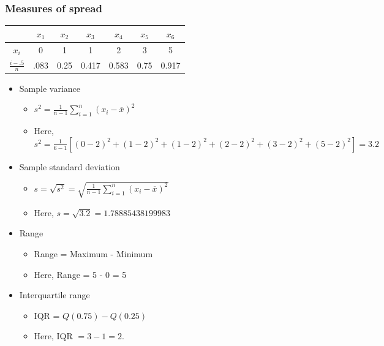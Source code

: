 \documentclass{beamer}
\providecommand{\ov}[1]{\overline{#1}}
\numberwithin{equation}{section}
\begin{document}
\begin{frame}
\frametitle{Measures of spread}\scriptsize

\begin{center}
\begin{tabular}{c|cccccc}
& $x_1$ & $x_2$ & $x_3$& $x_4$ & $x_5$ & $x_6$  \\ \hline
$x_i$ & 0 & 1 & 1 & 2 & 3 & 5 \\
$\frac{i - .5}{n}$ & .083 & 0.25 & 0.417 & 0.583 & 0.75 & 0.917
\end{tabular}
\end{center} 

\begin{itemize}
\item Sample variance
\begin{itemize}
\item $s^2 = \frac{1}{n-1} \sum_{i = 1}^n (x_i - \ov{x})^2$
\item Here, $s^2 = \frac{1}{6 - 1}[(0-2)^2 + (1-2)^2 + (1-2)^2 + (2-2)^2 + (3-2)^2 + (5-2)^2] = 3.2$
\end{itemize}
\item Sample standard deviation
\begin{itemize}
\item $s = \sqrt{s^2} = \sqrt{ \frac{1}{n-1} \sum_{i = 1}^n (x_i - \ov{x})^2}$
\item Here, $s = \sqrt{3.2} = 1.78885438199983$
\end{itemize}
\item Range
\begin{itemize}
\item Range = Maximum - Minimum
\item Here, Range = 5 - 0 = 5
\end{itemize}
\item Interquartile range
\begin{itemize}
\item IQR = $Q(0.75) - Q(0.25)$
\item Here, IQR $ = 3 - 1 = 2$. 
\end{itemize}
\end{itemize}
\end{frame}
\end{document}
